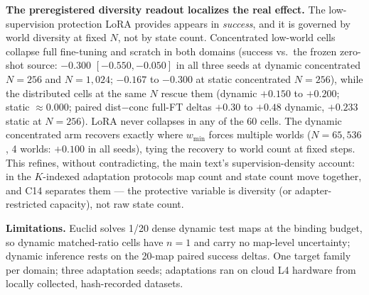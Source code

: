 \documentclass[letterpaper]{article} %
\begin{document}
\textbf{The preregistered diversity readout localizes the real effect.} The low-supervision protection LoRA provides appears in \emph{success}, and it is governed by world diversity at fixed $N$, not by state count. Concentrated low-world cells collapse full fine-tuning and scratch in both domains (success vs.\ the frozen zero-shot source: $-0.300$ $[-0.550,-0.050]$ in all three seeds at dynamic concentrated $N{=}256$ and $N{=}1{,}024$; $-0.167$ to $-0.300$ at static concentrated $N{=}256$), while the distributed cells at the same $N$ rescue them (dynamic $+0.150$ to $+0.200$; static $\approx 0.000$; paired dist$-$conc full-FT deltas $+0.30$ to $+0.48$ dynamic, $+0.233$ static at $N{=}256$). LoRA never collapses in any of the 60 cells. The dynamic concentrated arm recovers exactly where $w_{\min}$ forces multiple worlds ($N{=}65{,}536$, 4 worlds: $+0.100$ in all seeds), tying the recovery to world count at fixed steps. This refines, without contradicting, the main text's supervision-density account: in the $K$-indexed adaptation protocols map count and state count move together, and C14 separates them --- the protective variable is diversity (or adapter-restricted capacity), not raw state count.

\textbf{Limitations.} Euclid solves 1/20 dense dynamic test maps at the binding budget, so dynamic matched-ratio cells have $n{=}1$ and carry no map-level uncertainty; dynamic inference rests on the 20-map paired success deltas. One target family per domain; three adaptation seeds; adaptations ran on cloud L4 hardware from locally collected, hash-recorded datasets.
\end{document}

